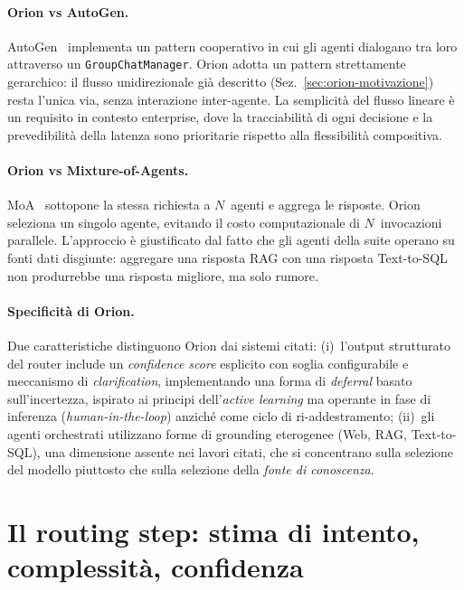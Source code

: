 \paragraph{Orion vs AutoGen.} AutoGen~\cite{wu2023autogen} implementa un pattern cooperativo in cui gli agenti
dialogano tra loro attraverso un \texttt{GroupChatManager}. Orion adotta un pattern strettamente gerarchico:
il flusso unidirezionale già descritto (Sez.~\ref{sec:orion-motivazione}) resta l'unica via,
senza interazione inter-agente. La semplicità del flusso lineare è un requisito in contesto enterprise,
dove la tracciabilità di ogni decisione e la prevedibilità della latenza sono prioritarie rispetto alla flessibilità compositiva.

\paragraph{Orion vs Mixture-of-Agents.} MoA~\cite{wang2024moa} sottopone la stessa richiesta a $N$~agenti e aggrega le risposte.
Orion seleziona un singolo agente, evitando il costo computazionale di $N$~invocazioni parallele.
L'approccio è giustificato dal fatto che gli agenti della suite operano su fonti dati disgiunte:
aggregare una risposta RAG con una risposta Text-to-SQL non produrrebbe una risposta migliore, ma solo rumore.

\paragraph{Specificità di Orion.} Due caratteristiche distinguono Orion dai sistemi citati: (i)~l'output
strutturato del router include un \emph{confidence score} esplicito con soglia configurabile e meccanismo di \emph{clarification},
implementando una forma di \emph{deferral} basato sull'incertezza, ispirato ai principi dell'\emph{active learning}
ma operante in fase di inferenza (\emph{human-in-the-loop}) anziché come ciclo di ri-addestramento; (ii)~gli agenti orchestrati utilizzano forme di
grounding eterogenee (Web, RAG, Text-to-SQL), una dimensione assente nei lavori citati,
che si concentrano sulla selezione del modello piuttosto che sulla selezione della \emph{fonte di conoscenza}.

\section{Il routing step: stima di intento, complessità, confidenza}
\label{sec:orion-routing}

